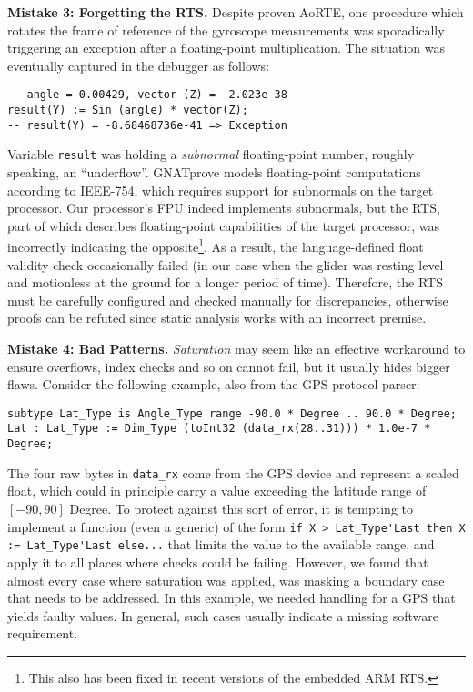 \textbf{Mistake 3: Forgetting the RTS.} Despite proven AoRTE, one
procedure which rotates the frame of reference of the gyroscope
measurements was sporadically triggering an exception after a
floating-point multiplication. The situation was eventually captured
in the debugger as follows:
\begin{lstlisting}[name=subnormal]
-- angle = 0.00429, vector (Z) = -2.023e-38
result(Y) := Sin (angle) * vector(Z);
-- result(Y) = -8.68468736e-41 => Exception
\end{lstlisting}
Variable \lstinline$result$ was holding a \emph{subnormal} floating-point number,
roughly speaking, an ``underflow''. GNATprove models floating-point
computations according to IEEE-754, which requires support for
subnormals on the target processor. Our processor's FPU indeed
implements subnormals, but the RTS, part of which describes
floating-point capabilities of the target processor, was incorrectly
indicating the opposite\footnote{This also has been fixed in recent
  versions of the embedded ARM RTS.}. As a result, the language-defined
float validity check occasionally failed (in our case when the glider
was resting level and motionless at the ground for a longer period of
time). 
  Therefore, the RTS must be carefully configured and checked manually
  for discrepancies, otherwise proofs can be refuted since static
  analysis works with an incorrect premise.

\textbf{Mistake 4: Bad Patterns.} %
\emph{Saturation} may seem like an effective workaround to ensure
overflows, index checks and so on cannot fail, but it usually hides
bigger flaws. Consider the following example, also from the GPS protocol parser:
\begin{lstlisting}[name=saturate]
subtype Lat_Type is Angle_Type range -90.0 * Degree .. 90.0 * Degree;
Lat : Lat_Type := Dim_Type (toInt32 (data_rx(28..31))) * 1.0e-7 * Degree;
\end{lstlisting}
The four raw bytes in \lstinline$data_rx$ come from the GPS device and represent a scaled float, which could in
principle carry a value exceeding the latitude range of $[-90,90]$
Degree. To protect against this sort of error, it is tempting to
implement a function (even a generic) of the form
\lstinline$if X > Lat_Type'Last then X := Lat_Type'Last else...$ that limits the value to the available range, and apply it to all
places where checks could be failing. However, we found that almost every
case where saturation was applied, was masking a
boundary case that needs to be addressed. In this example, we needed
handling for a GPS that yields faulty values. 
In general, such cases usually indicate a missing software requirement.

